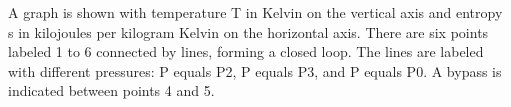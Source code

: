 A graph is shown with temperature T in Kelvin on the vertical axis and entropy s in kilojoules per kilogram Kelvin on the horizontal axis. There are six points labeled 1 to 6 connected by lines, forming a closed loop. The lines are labeled with different pressures: P equals P2, P equals P3, and P equals P0. A bypass is indicated between points 4 and 5.